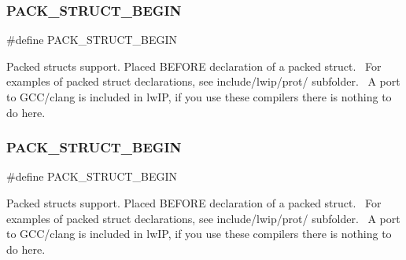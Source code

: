 \subsubsection{\texorpdfstring{P\+A\+C\+K\+\_\+\+S\+T\+R\+U\+C\+T\+\_\+\+B\+E\+G\+IN}{PACK\_STRUCT\_BEGIN}\hspace{0.1cm}{\footnotesize\ttfamily [1/2]}}
{\footnotesize\ttfamily \#define P\+A\+C\+K\+\_\+\+S\+T\+R\+U\+C\+T\+\_\+\+B\+E\+G\+IN}

Packed structs support. Placed B\+E\+F\+O\+RE declaration of a packed struct.~\newline
For examples of packed struct declarations, see include/lwip/prot/ subfolder.~\newline
A port to G\+C\+C/clang is included in lw\+IP, if you use these compilers there is nothing to do here. \mbox{\label{group__compiler__abstraction_ga73199061891adf1b912d20835c7d5e96}} 
\subsubsection{\texorpdfstring{P\+A\+C\+K\+\_\+\+S\+T\+R\+U\+C\+T\+\_\+\+B\+E\+G\+IN}{PACK\_STRUCT\_BEGIN}\hspace{0.1cm}{\footnotesize\ttfamily [2/2]}}
{\footnotesize\ttfamily \#define P\+A\+C\+K\+\_\+\+S\+T\+R\+U\+C\+T\+\_\+\+B\+E\+G\+IN}

Packed structs support. Placed B\+E\+F\+O\+RE declaration of a packed struct.~\newline
For examples of packed struct declarations, see include/lwip/prot/ subfolder.~\newline
A port to G\+C\+C/clang is included in lw\+IP, if you use these compilers there is nothing to do here. \mbox{\label{group__compiler__abstraction_ga465fef70f294e21cbf4ea51fc342f20e}} 
